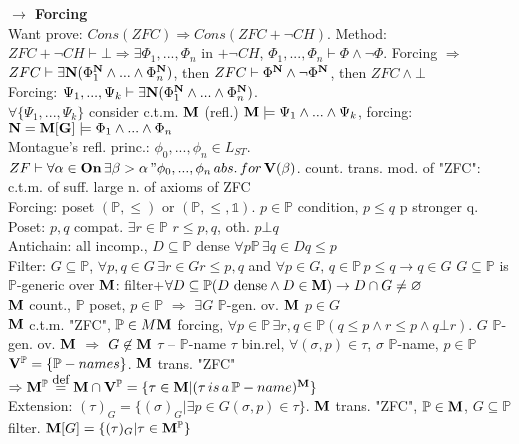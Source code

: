 \documentclass[9pt]{article}
\newcommand{\class}[1]{{\bf #1}}
\newcommand{\Pp}{\mathbb{P}}
\newcommand{\eqdef}{\overset{\mbox{\small{def}}}{=}}
\newcommand{\mytitle}[1]{ {\bf $\rightarrow$ #1}\\}
\newcommand{\On}{\class{On}}
\newcommand{\V}{\class{V}}
\begin{document}
\begin{multicols*}{2}
\mytitle{Forcing}
Want prove: $Cons(ZFC)\Rightarrow Cons(ZFC+\neg CH)$.
Method: $ZFC+\neg CH\vdash\bot\Rightarrow\exists \Phi_1,...,\Phi_n$ in $+\neg CH$, $\Phi_1,...,\Phi_n\vdash \Phi \wedge\neg\Phi$.
Forcing $\Rightarrow$ $ZFC\vdash\exists\class{N}(\Phi_1^\class{N}\wedge...\wedge\Phi_n^\class{N})$, then $ZFC\vdash \Phi^\class{N}\wedge\neg\Phi^\class{N}$, then $ZFC\wedge\bot$\\
Forcing: $\Psi_1,...,\Psi_k\vdash \exists\class{N}(\Phi_1^\class{N}\wedge...\wedge\Phi_n^\class{N})$.\\
$\forall \{\Psi_1,...,\Psi_k\}$ consider c.t.m. $\class{M}$ (refl.) $\class{M}\models \Psi_1\wedge...\wedge\Psi_k$, forcing: $\class{N}=\class{M}[\class{G}]\models\Phi_1\wedge...\wedge\Phi_n$\\

Montague's refl. princ.: $\phi_0,...,\phi_n\in L_{ST}$. $ZF\vdash \forall\alpha\in\On\,\exists\beta>\alpha \,"\phi_0,...,\phi_n\,abs.\,for\,\V(\beta)$. count. trans. mod. of "ZFC": c.t.m. of suff. large n. of axioms of ZFC\\
Forcing: poset $(\mathbb{P}, \leqslant)$ or $(\mathbb{P}, \leqslant,\mathbb{1})$. $p\in \Pp$ condition, $p\leqslant q$ p stronger q.\\
Poset: $p,q$ compat. $\exists r\in \Pp$ $r\leqslant p, q$, oth. $p\bot q$\\
Antichain: all incomp., $D\subseteq \Pp$ dense $\forall p\Pp\,\exists q\in D q\leqslant p$\\
Filter: $G\subseteq \Pp$, $\forall p, q\in G\,\exists r\in G r\leqslant p, q$ and $\forall p\in G,\,q\in \Pp\,p\leqslant q\rightarrow q\in G$
$G\subseteq \Pp$ is $\Pp$-generic over $\class{M}$: filter+$\forall D\subseteq \Pp (D\mbox{ dense}\wedge D\in\class{M})\rightarrow D\cap G\neq \varnothing$\\
$\class{M}$ count., $\Pp$ poset, $p\in \Pp$ $\Rightarrow$ $\exists G$ $\Pp$-gen. ov. $\class{M}$ $p\in G$\\
$\class{M}$ c.t.m. "ZFC", $\Pp\in M\class{M}$ forcing, $\forall p\in\Pp\,\exists r,q\in\Pp (q\leqslant p\wedge r\leqslant p\wedge q\bot r)$. $G$ $\Pp$-gen. ov. $\class{M}$ $\Rightarrow$ $G\not\in\class{M}$
$\tau$ -- $\Pp$-name $\tau$ bin.rel, $\forall (\sigma,p)\in\tau$, $\sigma$ $\Pp$-name, $p\in\Pp$\\
$\V^\Pp=\{\Pp-names\}$. $\class{M}$ trans. "ZFC" $\Rightarrow \class{M}^\Pp\eqdef \class{M}\cap\V^\Pp=\{\tau\in\class{M}|(\tau\,is\,a\,\Pp-name)^\class{M}\}$\\
Extension: $(\tau)_G=\{(\sigma)_G|\exists p\in G(\sigma,p)\in\tau\}$. $\class{M}$ trans. "ZFC", $\Pp\in\class{M}$, $G\subseteq \Pp$ filter. $\class{M}[G]=\{(\tau)_G|\tau\in\class{M}^\Pp\}$\\

\end{multicols*}
\end{document}
